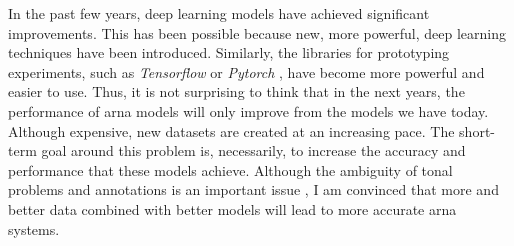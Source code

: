 

In the past few years, deep learning models have achieved
significant improvements. This has been possible because
new, more powerful, deep learning techniques have been
introduced. Similarly, the libraries for prototyping
experiments, such as \emph{Tensorflow}
\parencite{abadi2016tensorflow} or \emph{Pytorch}
\parencite{paszke2019pytorch}, have become more powerful and
easier to use. Thus, it is not surprising to think that in
the next years, the performance of \gls{arna} models will
only improve from the models we have today. Although
expensive, new datasets are created at an increasing pace.
The short-term goal around this problem is, necessarily, to
increase the accuracy and performance that these models
achieve. Although the ambiguity of tonal problems and
annotations is an important issue
\parencite{ju2021addressing}, I am convinced that more and
better data combined with better models will lead to more
accurate \gls{arna} systems.
